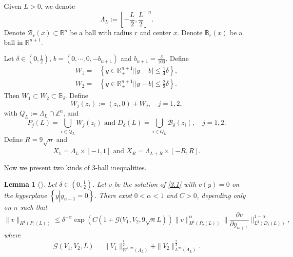 \documentclass{article}
\numberwithin{equation}{section}
\newcommand\R{\ensuremath{\mathbb{R}}}
\newcommand\Z{\ensuremath{\mathbb{Z}}}
\newtheorem{lemma}[theorem]{Lemma}
\numberwithin{equation}{section}
\theoremstyle{definition}
\begin{document}
Given $L>0$, we denote
 \[
\Lambda_L:= \left[ -\frac{L}{2},\frac{L}{2} \right] ^{n}.
\] 
Denote $\mathcal{B}_{r}(x) \subset \R^{n}$ be a ball with radius $r$ and center $x$. Denote  $\mathbb{B}_r(x)$ be a ball in $\R^{n+1}$.


Let $\delta \in (0,\frac{1}{2})$, $b=(0,\cdots ,0,-b_{n+1})$ and $b_{n+1}= \frac{\delta}{100}$. Define
\begin{equation*}
	\begin{aligned}
		W_1=&\left\{y \in \R^{n+1}_+\lvert |y-b|\le \frac{1}{4}\delta\right\}, \\
		W_2=& \left\{y \in \R^{n+1}_+\lvert |y-b|\le \frac{2}{3}\delta\right\}.
	\end{aligned} 
\end{equation*}
Then $W_1\subset W_2\subset \mathbb{B}_{\delta}$. Define
\[
W_j(z_i):=(z_i,0)+W_j, \quad  j=1,2,
\]
with $Q_L:= \Lambda_L \cap \Z^{n}$,
and
\[
P_j(L)= \bigcup_{i\in Q_{L}} W_j\left( z_i \right) \text{ and } D_{\delta}(L)=\bigcup_{i\in Q_L} \mathcal{B}_{\delta}(z_i), \quad j=1,2.
\] 
Define $R=9 \sqrt{n} $ and
\begin{equation}
	X_1=\Lambda_L\times [-1,1] \text{ and }\widetilde{X}_{R}=\Lambda_{L+R}\times [-R,R].
\end{equation}

Now we present two kinds of 3-ball inequalities.
\begin{lemma}[{\cite[Lemma~1]{zhu2023spectral}}]\label{lma3.1}
	Let  $\delta \in (0,\frac{1}{2})$. Let $v$ be the solution of \eqref{3.1} with $v(y)=0$ on the hyperplane $\left\{y\left| y_{n+1}=0\right.\right\} $. There exist $0<\alpha <1$ and $C>0$, depending only on $n$ such that
	\begin{equation}\label{3.2}
		\|v\|_{H^{1}\left( P_1(L) \right) }\le \delta^{-\alpha }\exp \left( C\left( 1+\mathcal{G}(V_1,V_2,9\sqrt{n} L \right)  \right) \|v\|^{\alpha }_{H^{1}\left( P_2(L) \right) }\|\frac{\partial v}{\partial y_{n+1}}\|^{1-\alpha }_{L^2\left( D_\delta(L) \right) }, 
	\end{equation}
	where 
	\begin{equation}\label{3.3}
		\mathcal{G}\left( V_1,V_2,L \right) =\|V_1\|^{\frac{1}{2}}_{W^{1,\infty}(\Lambda_L)}+\|V_2\|^{\frac{2}{3}}_{L^{\infty}(\Lambda_L)}.
	\end{equation}
\end{lemma}
\end{document}
